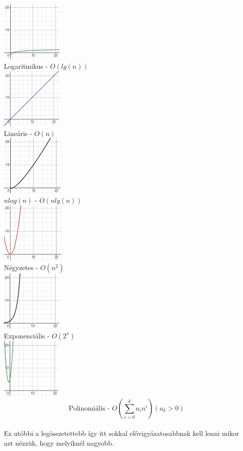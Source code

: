 \documentclass{article}
\theoremstyle{mytheoremstyle}
\theoremstyle{mytheoremstyle}
\theoremstyle{myproblemstyle}
\begin{document}
\begin{center}
    \includegraphics[height=3cm]{logx}\\Logaritmikus - $O(lg(n))$\\
    \newpage
    \includegraphics[height=3cm]{x}\\Lineáris - $O(n)$\\
    \includegraphics[height=3cm]{xlogx}\\$n log(n)$ - $O (nlg (n) )$\\
    \includegraphics[height=3cm]{xx}\\Négyzetes - $O (n^2) $\\
    \includegraphics[height=3cm]{2onx}\\Exponenciális - $O (2^x)$\\
    \includegraphics[height=3cm]{xpoli}\\\[\text{Polinomiális - }
    O(\sum_{i=0}^{k}a_i n^i)(a_k>0)\]\\
    Ez utóbbi a legösszetettebb így itt sokkal elővigyázatosabbnak kell lenni mikor
    azt nézzük, hogy melyiknél nagyobb.
\end{center}
\end{document}
